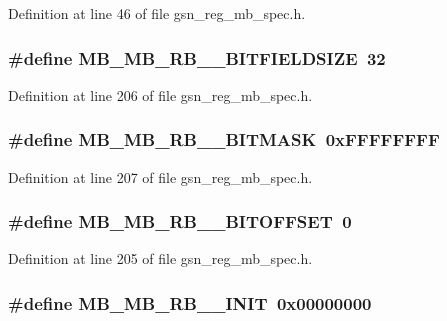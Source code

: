 Definition at line 46 of file gsn\_\-reg\_\-mb\_\-spec.h.

\hypertarget{a00562_a186495a4e987fa9cf41de20f3d91c75d}{
\subsubsection[{MB\_\-MB\_\-RB\_\-0\_\-BITFIELDSIZE}]{\setlength{\rightskip}{0pt plus 5cm}\#define MB\_\-MB\_\-RB\_\_\-BITFIELDSIZE~32}}
\label{a00562_a186495a4e987fa9cf41de20f3d91c75d}


Definition at line 206 of file gsn\_\-reg\_\-mb\_\-spec.h.

\hypertarget{a00562_a3652fc00ec77ef172c0588a0d7bd577b}{
\subsubsection[{MB\_\-MB\_\-RB\_\-0\_\-BITMASK}]{\setlength{\rightskip}{0pt plus 5cm}\#define MB\_\-MB\_\-RB\_\_\-BITMASK~0xFFFFFFFF}}
\label{a00562_a3652fc00ec77ef172c0588a0d7bd577b}


Definition at line 207 of file gsn\_\-reg\_\-mb\_\-spec.h.

\hypertarget{a00562_afa518a22ef88aaa5f2ccfad75ee57ae7}{
\subsubsection[{MB\_\-MB\_\-RB\_\-0\_\-BITOFFSET}]{\setlength{\rightskip}{0pt plus 5cm}\#define MB\_\-MB\_\-RB\_\_\-BITOFFSET~0}}
\label{a00562_afa518a22ef88aaa5f2ccfad75ee57ae7}


Definition at line 205 of file gsn\_\-reg\_\-mb\_\-spec.h.

\hypertarget{a00562_a2214f99c9af4d1d530aded3478cf16ed}{
\subsubsection[{MB\_\-MB\_\-RB\_\-0\_\-INIT}]{\setlength{\rightskip}{0pt plus 5cm}\#define MB\_\-MB\_\-RB\_\_\-INIT~0x00000000}}
\label{a00562_a2214f99c9af4d1d530aded3478cf16ed}


